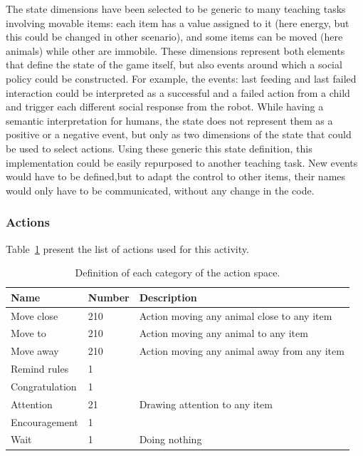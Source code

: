 The state dimensions have been selected to be generic to many teaching tasks involving movable items: each item has a value assigned to it (here energy, but this could be changed in other scenario), and some items can be moved (here animals) while other are immobile. These dimensions represent both elements that define the state of the game itself, but also events around which a social policy could be constructed. For example, the events: last feeding and last failed interaction could be interpreted as a successful and a failed action from a child and trigger each different social response from the robot. While having a semantic interpretation for humans, the state does not represent them as a positive or a negative event, but only as two dimensions of the state that could be used to select actions. Using these generic this state definition, this implementation could be easily repurposed to another teaching task. New events would have to be defined,but to adapt the control to other items, their names would only have to be communicated, without any change in the code.

\subsubsection{Actions}

Table~\ref{tab:tuto_actions_space} present the list of actions used for this activity.

\begin{table}[ht]
	\centering
	\caption{Definition of each category of the action space.}
	\label{tab:tuto_actions_space}
	\begin{tabularx}{\textwidth}{@{}llX@{}}\toprule
		Name & Number & Description \\
		\midrule
		Move close & 210 &  Action moving any animal close to any item\\
		Move to & 210 & Action moving any animal to any item\\
		Move away & 210 & Action moving any animal away from any item\\
		Remind rules & 1 & \\
		Congratulation & 1 & \\
		Attention & 21 & Drawing attention to any item\\
		Encouragement & 1 & \\
		Wait & 1 & Doing nothing\\
		\bottomrule
	\end{tabularx}
\end{table}

